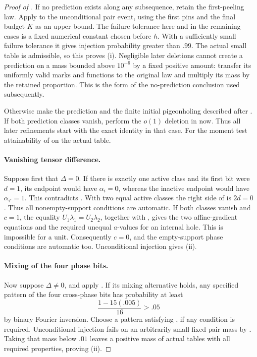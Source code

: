 \begin{proof}[Proof of ]
If no prediction exists along any subsequence, retain the
first-peeling law.  Apply  to the
unconditional pair event, using the first pins and the final
budget \(K\) as an upper bound. The failure tolerance here and
in the remaining cases is a fixed numerical constant chosen before
\(h\). With a sufficiently small failure tolerance it gives
injection probability greater
than \(.99\).  The actual small table is admissible, so this
proves (i).  Negligible later deletions cannot create a
prediction on a mass bounded above \(10^{-6}\) by a fixed
positive amount: transfer its uniformly valid marks and
functions to the original law and multiply its mass by
the retained proportion.  This is the form of the
no-prediction conclusion used subsequently.

Otherwise make the prediction and the finite initial
pigeonholing described after .
If both prediction classes vanish, perform the \(o(1)\) deletion
in  now.  Thus all later refinements
start with the exact identity in that case.
For the moment test attainability of
 on the actual table.

\paragraph{Vanishing tensor difference.}
Suppose first that \(\Delta=0\).
If there is exactly one active class and its first bit
were \(d=1\), its endpoint would have \(\alpha_i=0\),
whereas the inactive endpoint would have \(\alpha_{i'}=1\).
This contradicts .
With two equal active classes the right side of
 is \(2d=0\).
Thus all nonempty-support conditions are automatic.
If both classes vanish and \(c=1\), the equality
\(U_1\lambda_1=U_2\lambda_2\), together with
, gives the two affine-gradient
equations and the required unequal \(a\)-values for an
internal hole.  This is impossible for a unit.
Consequently \(c=0\), and the empty-support phase conditions
are automatic too.  Unconditional injection gives (ii).

\paragraph{Mixing of the four phase bits.}
Now suppose \(\Delta\ne0\), and apply
.
If its mixing alternative holds, any specified pattern of
the four cross-phase bits has probability at least
\[
 \frac{1-15(.005)}{16}>.05
 \]
by binary Fourier inversion.  Choose a pattern satisfying
, if any condition is required.
Unconditional injection fails on an arbitrarily small
fixed pair mass by .  Taking that mass
below \(.01\) leaves a positive mass of actual tables with
all required properties, proving (ii).


\end{proof}
